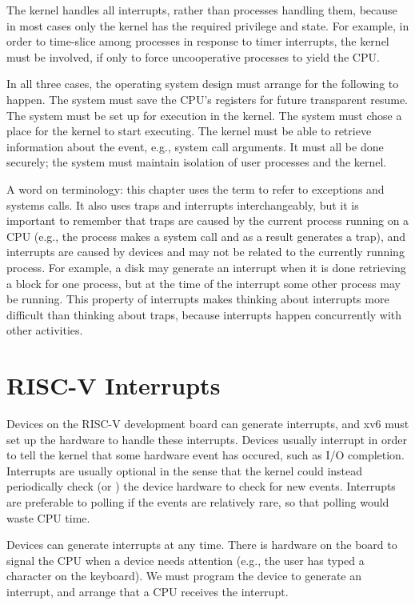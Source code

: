 The kernel handles all interrupts, rather than processes
handling them, because in most cases only the kernel has the
required privilege and state. For example, in order to time-slice
among processes in response to timer interrupts, the kernel
must be involved, if only to force uncooperative processes to
yield the CPU.

In all three cases, the operating system design must arrange for the
following to happen.  The system must save the CPU's registers for future
transparent resume.  The system must be set up for execution
in the kernel.  The system must chose a place for the kernel to start
executing. The kernel must be able to retrieve information about the
event, e.g., system call arguments.  It must all be done securely; the system
must maintain isolation of user processes and the kernel.

A word on terminology: this chapter uses the term  to refer
to exceptions and systems calls.  It also uses
traps and interrupts
interchangeably, but it is important to remember that traps are caused
by the current process running on a CPU (e.g., the process makes
a system call and as a result generates a trap), and interrupts are
caused by devices and may not be related to the currently running
process.  For example, a disk may generate an interrupt when it is
done retrieving a block for one process, but at the time of the
interrupt some other process may be running.  This property of
interrupts makes thinking about interrupts more difficult than
thinking about traps, because interrupts happen concurrently with
other activities.

\section{RISC-V Interrupts}

Devices on the RISC-V development board can generate interrupts, and
xv6 must set up the hardware to handle these interrupts.  Devices
usually interrupt in order to tell the kernel that some hardware event
has occured, such as I/O completion.  Interrupts are usually optional
in the sense that the kernel could instead periodically check (or
) the device hardware to check for new
events.  Interrupts are preferable to polling if the events are
relatively rare, so that polling would waste CPU time.

Devices can generate interrupts
at any time.  There is hardware on the board to signal the CPU
when a device needs attention (e.g., the user has typed a character on
the keyboard). We must program the device to generate an interrupt, and
arrange that a CPU receives the interrupt. 

